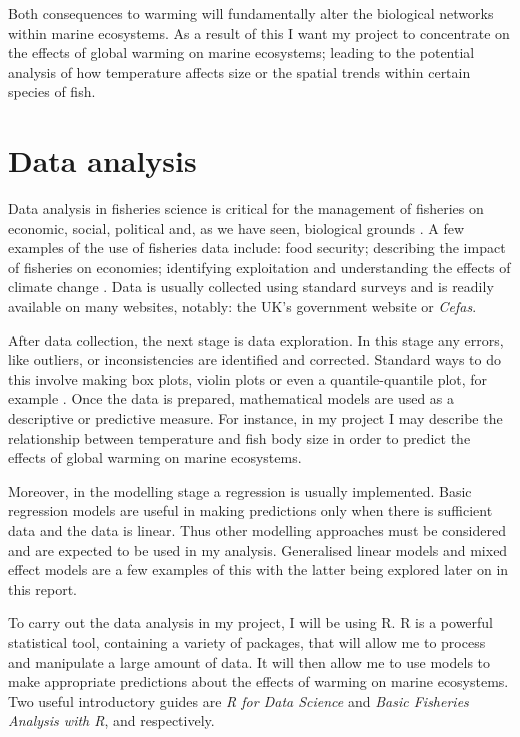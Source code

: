 \documentclass{article}
\begin{document}
Both consequences to warming will fundamentally alter the biological networks within marine ecosystems. As a result of this I want my project to concentrate on the effects of global warming on marine ecosystems; leading to the potential analysis of how temperature affects size or the spatial trends within certain species of fish.

\section{Data analysis}

Data analysis in fisheries science is critical for the management of fisheries on economic, social, political and, as we have seen, biological grounds \cite{9}. A few examples of the use of fisheries data include: food security; describing the impact of fisheries on economies; identifying exploitation and understanding the effects of climate change \cite{10}. Data is usually collected using standard surveys and is readily available on many websites, notably: the UK’s government website or \textit{Cefas}.

After data collection, the next stage is data exploration. In this stage any errors, like outliers, or inconsistencies are identified and corrected. Standard ways to do this involve making box plots, violin plots or even a quantile-quantile plot, for example \cite{9}. Once the data is prepared, mathematical models are used as a descriptive or predictive measure. For instance, in my project I may describe the relationship between temperature and fish body size in order to predict the effects of global warming on marine ecosystems. 

Moreover, in the modelling stage a regression is usually implemented. Basic regression models are useful in making predictions only when there is sufficient data and the data is linear. Thus other modelling approaches must be considered and are expected to be used in my analysis. Generalised linear models and mixed effect models \cite{9} are a few examples of this with the latter being explored later on in this report.

To carry out the data analysis in my project, I will be using R. R is a powerful statistical tool, containing a variety of packages, that will allow me to process and manipulate a large amount of data. It will then allow me to use models to make appropriate predictions about the effects of warming on marine ecosystems. Two useful introductory guides are \textit{R for Data Science} and \textit{Basic Fisheries Analysis with R}, \cite{11} and \cite{12} respectively.
 
\end{document}

